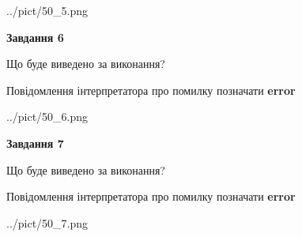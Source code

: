 \documentclass[10pt, ukrainian]{article}
\begin{document}
{\begin {large}
\begin{center}
	{../pict/50_5.png}
\end{center}
\newpage

{\begin {center}\textbf{Завдання 6}\end {center}}\par
Що буде виведено за виконання? \par
Повідомлення інтерпретатора про помилку позначати \textbf{error}

\begin{center}
	{../pict/50_6.png}
\end{center}
\newpage

{\begin {center}\textbf{Завдання 7}\end {center}}\par
Що буде виведено за виконання? \par
Повідомлення інтерпретатора про помилку позначати \textbf{error}

\begin{center}
	{../pict/50_7.png}
\end{center}
\newpage

\end {large}}
\end{document}
